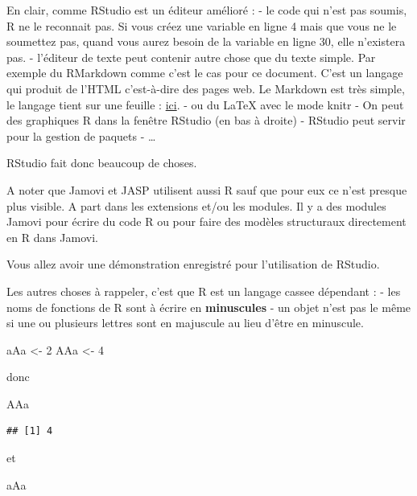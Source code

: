 \documentclass[
]{book}
\newenvironment{Shaded}{\begin{snugshade}}{\end{snugshade}}
\newcommand{\DecValTok}[1]{\textcolor[rgb]{0.00,0.00,0.81}{#1}}
\newcommand{\NormalTok}[1]{#1}
\newcommand{\OtherTok}[1]{\textcolor[rgb]{0.56,0.35,0.01}{#1}}
\begin{document}
En clair, comme RStudio est un éditeur amélioré :
- le code qui n'est pas soumis, R ne le reconnait pas. Si vous créez une variable
en ligne 4 mais que vous ne le soumettez pas, quand vous aurez besoin de la
variable en ligne 30, elle n'existera pas.
- l'éditeur de texte peut contenir autre chose que du texte simple. Par exemple
du RMarkdown comme c'est le cas pour ce document. C'est un langage qui produit
de l'HTML c'est-à-dire des pages web. Le Markdown est très simple, le langage
tient sur une feuille : \href{https://www.markdownguide.org/cheat-sheet/}{ici}.
- ou du LaTeX avec le mode knitr
- On peut des graphiques R dans la fenêtre RStudio (en bas à droite)
- RStudio peut servir pour la gestion de paquets
- \ldots{}

RStudio fait donc beaucoup de choses.

A noter que Jamovi et JASP utilisent aussi R sauf que pour eux ce n'est presque
plus visible. A part dans les extensions et/ou les modules. Il y a des modules
Jamovi pour écrire du code R ou pour faire des modèles structuraux directement
en R dans Jamovi.

Vous allez avoir une démonstration enregistré pour l'utilisation de RStudio.

Les autres choses à rappeler, c'est que R est un langage cassee dépendant :
- les noms de fonctions de R sont à écrire en \textbf{minuscules}
- un objet n'est pas le même si une ou plusieurs lettres sont en majuscule au lieu
d'être en minuscule.

\begin{Shaded}
\begin{Highlighting}[]
\NormalTok{aAa }\OtherTok{\textless{}{-}} \DecValTok{2}
\NormalTok{AAa }\OtherTok{\textless{}{-}} \DecValTok{4}
\end{Highlighting}
\end{Shaded}

donc

\begin{Shaded}
\begin{Highlighting}[]
\NormalTok{AAa}
\end{Highlighting}
\end{Shaded}

\begin{verbatim}
## [1] 4
\end{verbatim}

et

\begin{Shaded}
\begin{Highlighting}[]
\NormalTok{aAa}
\end{Highlighting}
\end{Shaded}
\end{document}
